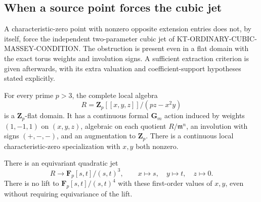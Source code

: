 \subsection{When a source point forces the cubic jet}
\label{sec:kt-source-to-cubic-jet}

A characteristic-zero point with nonzero opposite extension
entries does not, by itself, force the independent two-parameter
cubic jet of KT-ORDINARY-CUBIC-MASSEY-CONDITION.
The obstruction is present even in a flat domain with the exact
torus weights and involution signs.  A sufficient extraction
criterion is given afterwards, with its extra valuation and
coefficient-support hypotheses stated explicitly.

\begin{proposition}
For every prime $p>3$, the complete local algebra
\[
 R=\mathbf Z_p[[x,y,z]]/(pz-x^2y)                         \tag{SJ.1}
\]
is a $\mathbf Z_p$-flat domain.  It has a continuous formal
$\mathbf G_m$ action induced by weights $(1,-1,1)$ on $(x,y,z)$,
algebraic on each quotient $R/\mathfrak m^n$,
an involution with signs $(+,-,-)$, and an augmentation to
$\mathbf Z_p$.  There is a continuous local characteristic-zero
specialization with $x,y$ both nonzero.

There is an equivariant quadratic jet
\[
 R\longrightarrow \mathbf F_p[s,t]/(s,t)^3,\qquad
             x\mapsto s,\quad y\mapsto t,\quad z\mapsto0.
                                                               \tag{SJ.2}
\]
There is no lift to $\mathbf F_p[s,t]/(s,t)^4$ with these
first-order values of $x,y$, even without requiring
equivariance of the lift.
\end{proposition}
